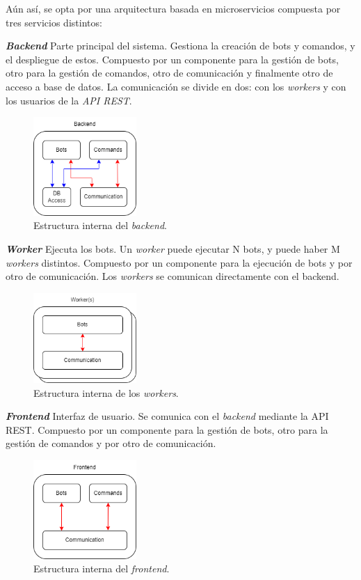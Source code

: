 Aún así, se opta por una arquitectura basada en microservicios compuesta por tres servicios distintos:

\textbf{\textit{Backend}} Parte principal del sistema. Gestiona la creación de bots y comandos, y el despliegue de estos. Compuesto por un componente para la gestión de bots, otro para la gestión de comandos, otro de comunicación y finalmente otro de acceso a base de datos. La comunicación se divide en dos: con los \textit{workers} y con los usuarios de la \textit{API REST}.

\begin{figure}[H]
	\centering
	\includegraphics[width=0.35\textwidth]{img/backend_internals.png}
	\caption{Estructura interna del \textit{backend}.}
\end{figure}

\textbf{\textit{Worker}} Ejecuta los bots. Un \textit{worker} puede ejecutar N bots, y puede haber M \textit{workers} distintos. Compuesto por un componente para la ejecución de bots y por otro de comunicación. Los \textit{workers} se comunican directamente con el backend.

\begin{figure}[H]
	\centering
	\includegraphics[width=0.35\textwidth]{img/worker_internals.png}
	\caption{Estructura interna de los \textit{workers}.}
\end{figure}


\textbf{\textit{Frontend}} Interfaz de usuario. Se comunica con el \textit{backend} mediante la API REST. Compuesto por un componente para la gestión de bots, otro para la gestión de comandos y por otro de comunicación.

\begin{figure}[H]
	\centering
	\includegraphics[width=0.35\textwidth]{img/frontend_internals.png}
	\caption{Estructura interna del \textit{frontend}.}
\end{figure}

